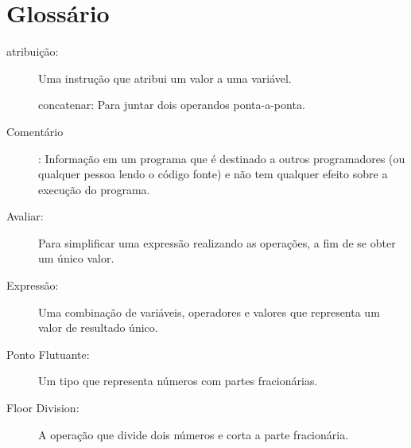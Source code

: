 {{{{{{{{{{{{{{{{{

\section{Glossário}

\begin{description}

\item[atribuição:] Uma instrução que atribui um valor a uma variável.

concatenar: Para juntar dois operandos ponta-a-ponta.

\item[Comentário]: Informação em um programa que é destinado a outros 
programadores (ou qualquer pessoa lendo o código fonte) e não tem qualquer
efeito sobre a execução do programa.

\item[Avaliar:] Para simplificar uma expressão realizando as operações, 
a fim de se obter um único valor.

\item[Expressão:] Uma combinação de variáveis, operadores e valores que representa um
valor de resultado único.

\item[Ponto Flutuante:] Um tipo que representa números com partes 
fracionárias.

\item[Floor Division:] A operação que divide dois números e corta 
a parte fracionária.


\end{description}}}}}}}}}}}}}}}}}}
